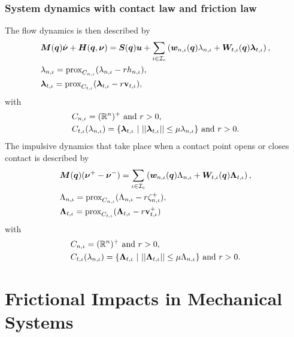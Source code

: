 \documentclass[../DC2017114Bouma.tex]{subfiles}
\begin{document}
\subsection{System dynamics with contact law and friction law}
The flow dynamics is then described by
\begin{align}
&{\boldsymbol{M}}({\boldsymbol{q}})\dot{\boldsymbol{\nu}} + {\boldsymbol{H}}({\boldsymbol{q}},\boldsymbol{\nu}) = {\boldsymbol{S}}({\boldsymbol{q}}){\boldsymbol{u}} + \sum_{i\in\mathcal{I}_c}\left({\boldsymbol{w}}_{n,\iota}({\boldsymbol{q}})\lambda_{n,\iota} + {\boldsymbol{W}}_{t,\iota}({\boldsymbol{q}})\boldsymbol{\lambda}_{t,\iota} \right), \label{eq:proxcontact1}\\
&\lambda_{n,\iota} = \operatorname{\text{prox}}_{C_{n,\iota}}(\lambda_{n,\iota} - rh_{n,\iota}),\label{eq:proxcontact2}\\
&\boldsymbol{\lambda}_{t,\iota} = \operatorname{\text{prox}}_{C_{t,\iota}}(\boldsymbol{\lambda}_{t,\iota} - r\mathbf{v}_{t,\iota}),\label{eq:proxcontact3}
\end{align}
with
\begin{align}
&C_{n,\iota} = (\Rbb^n)^+\text{ and } r>0,\\
&C_{t,\iota}(\lambda_{n,\iota}) = \{\lambdab_{t,\iota}\ |\ ||\lambdab_{t,\iota}|| \leq \mu\lambda_{n,\iota}\}\text{ and }r>0.
\end{align}
The impulsive dynamics that take place when a contact point opens or closes contact is described by
\begin{align}
&{\boldsymbol{M}}({\boldsymbol{q}})(\boldsymbol{\nu}^+ - \boldsymbol{\nu}^-) = \sum_{\iota\in\mathcal{I}_c}\left( {\boldsymbol{w}}_{n,\iota}({\boldsymbol{q}})\Lambda_{n,\iota} + {\boldsymbol{W}}_{t,\iota}({\boldsymbol{q}})\boldsymbol{\Lambda}_{t,\iota}\right), \label{eq:proximpact1}\\
&\Lambda_{n,\iota} = \operatorname{\text{prox}}_{C_{n,\iota}}(\Lambda_{n,\iota} - r\zeta^+_{n,\iota}),\label{eq:proximpact2}\\
&\boldsymbol{\Lambda}_{t,\iota} = \operatorname{\text{prox}}_{C_{t,\iota}}(\boldsymbol{\Lambda}_{t,\iota} - r\mathbf{v}^+_{t,\iota})\,\label{eq:proximpact3}
\end{align}
with
\begin{align}
&C_{n,\iota} = (\Rbb^n)^+\text{ and } r>0,\\
&C_{t,\iota}(\lambda_{n,\iota}) = \{\Lambdab_{t,\iota}\ |\ ||\Lambdab_{t,\iota}|| \leq \mu\Lambda_{n,\iota}\}\text{ and }r>0.
\end{align}

\pagestyle{fancyreport}
\cleartooddpage
\pagestyle{fancyreport}
\chapter{Frictional Impacts in Mechanical Systems}
\end{document}
